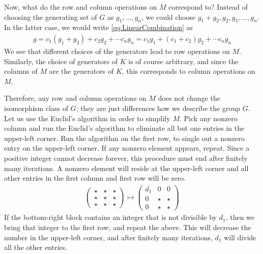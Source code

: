Now, what do the row and column operations on $M$ correspond to?
Instead of choosing the generating set of $G$ as $g_1,\ldots, g_n$,
we could choose $g_1+ g_2, g_2, g_3, \ldots, g_n$.
In the latter case, we would write \eqref{eq:LinearCombination} as
\begin{align}
 g = c_1(g_1+g_2) + c_2 g_2 + \cdots c_n g_n = c_1 g_1 + (c_1 + c_2) g_2 + \cdots c_n g_n 
\end{align}
We see that different choices of the generators lead to row operations on $M$.
Similarly, the choice of generators of $K$ is of course arbitrary,
and since the columns of $M$ are the generators of $K$,
this corresponds to column operations on $M$.

Therefore, any row and column operations on $M$ does not change 
the isomorphism class of $G$;
they are just differences how we describe the group $G$.
Let us use the Euclid's algorithm in order to simplify $M$.
Pick any nonzero column and run the Euclid's algorithm
to eliminate all but one entries in the upper-left corner.
Run the algorithm on the first row, to single out a nonzero entry on the upper-left corner.
If any nonzero element appears, repeat.
Since a positive integer cannot decrease forever,
this procedure must end after finitely many iterations.
A nonzero element will reside at the upper-left corner
and all other entries in the first column and first row will be zero.
\begin{align}
 \begin{pmatrix}
  \star & \star & \star \\ \star & \star & \star \\ \star & \star & \star 
 \end{pmatrix} \mapsto
 \begin{pmatrix}
  d_1 & 0 & 0 \\ 0 & \star & \star \\ 0 & \star & \star 
 \end{pmatrix}
\end{align}
If the bottom-right block contains an integer that is not divisible by $d_1$,
then we bring that integer to the first row, and repeat the above.
This will decrease the number in the upper-left corner,
and after finitely many iterations,
$d_1$ will divide all the other entries.


